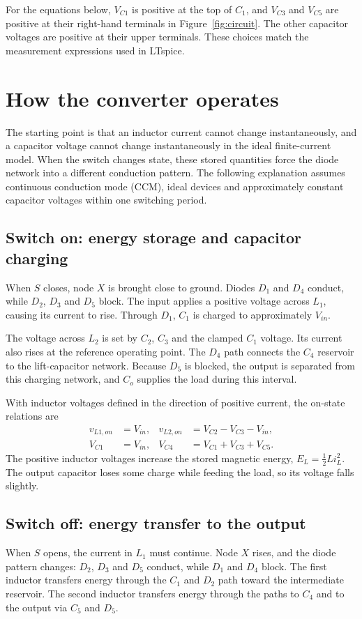 \documentclass[11pt,a4paper]{article}
\begin{document}
For the equations below, $V_{C1}$ is positive at the top of $C_1$, and $V_{C3}$ and $V_{C5}$ are positive at their right-hand terminals in Figure~\ref{fig:circuit}. The other capacitor voltages are positive at their upper terminals. These choices match the measurement expressions used in LTspice.
\clearpage
\section{How the converter operates}
The starting point is that an inductor current cannot change instantaneously, and a capacitor voltage cannot change instantaneously in the ideal finite-current model. When the switch changes state, these stored quantities force the diode network into a different conduction pattern. The following explanation assumes continuous conduction mode (CCM), ideal devices and approximately constant capacitor voltages within one switching period.
\subsection{Switch on: energy storage and capacitor charging}
When $S$ closes, node $X$ is brought close to ground. Diodes $D_1$ and $D_4$ conduct, while $D_2$, $D_3$ and $D_5$ block. The input applies a positive voltage across $L_1$, causing its current to rise. Through $D_1$, $C_1$ is charged to approximately $V_{in}$.

The voltage across $L_2$ is set by $C_2$, $C_3$ and the clamped $C_1$ voltage. Its current also rises at the reference operating point. The $D_4$ path connects the $C_4$ reservoir to the lift-capacitor network. Because $D_5$ is blocked, the output is separated from this charging network, and $C_o$ supplies the load during this interval.

With inductor voltages defined in the direction of positive current, the on-state relations are
\begin{align}
 v_{L1,on}&=V_{in}, & v_{L2,on}&=V_{C2}-V_{C3}-V_{in},\\
 V_{C1}&=V_{in}, & V_{C4}&=V_{C1}+V_{C3}+V_{C5}.
\end{align}
The positive inductor voltages increase the stored magnetic energy, $E_L=\tfrac12 Li_L^2$. The output capacitor loses some charge while feeding the load, so its voltage falls slightly.
\subsection{Switch off: energy transfer to the output}
When $S$ opens, the current in $L_1$ must continue. Node $X$ rises, and the diode pattern changes: $D_2$, $D_3$ and $D_5$ conduct, while $D_1$ and $D_4$ block. The first inductor transfers energy through the $C_1$ and $D_2$ path toward the intermediate reservoir. The second inductor transfers energy through the paths to $C_4$ and to the output via $C_5$ and $D_5$.
\end{document}
